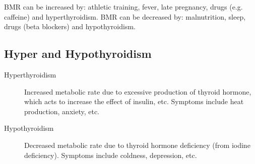 BMR can be increased by: athletic training, fever, late pregnancy, drugs (e.g. caffeine) and hyperthyroidism.
BMR can be decreased by: malnutrition, sleep, drugs (beta blockers) and hypothyroidism.

\subsection{Hyper and Hypothyroidism}

\begin{description}
\item [Hyperthyroidism] Increased metabolic rate due to excessive production of thyroid hormone, which acts to increase the effect of insulin, etc. Symptoms include heat production, anxiety, etc.
\item [Hypothyroidism] Decreased metabolic rate due to thyroid hormone deficiency (from iodine deficiency). Symptoms include coldness, depression, etc.
\end{description}
